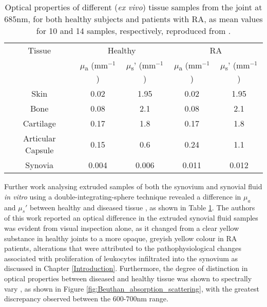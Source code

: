 \documentclass[twoside]{bhamthesis}
\theoremstyle{definition}
\begin{document}
\bgroup
\def\arraystretch{1.2}
\begin{table}[!ht]
\small
\begin{center}
 \begin{tabular}{|c | c c |  c c|}
 \hline
Tissue & \multicolumn{2}{c|}{Healthy} & \multicolumn{2}{c|}{RA}\\ 
 & $\mu$\textsubscript{a} (mm$^{-1}$) &  $\mu$\textsubscript{s}' (mm$^{-1}$)  & $\mu$\textsubscript{a} (mm$^{-1}$) & $\mu$\textsubscript{s}' (mm$^{-1}$) \\ 
 
 \hline
 Skin  & 0.02 & 1.95 & 0.02  & 1.95
 \\ 
 Bone  & 0.08 & 2.1 & 0.08  & 2.1
 \\ 
 Cartilage  & 0.17 & 1.8 & 0.17  & 1.8
 \\ 
 Articular Capsule & 0.15  & 0.6 &0.24 & 1.1
 \\ 
 Synovia & 0.004 & 0.006& 0.011 & 0.012 
 \\
 \hline
\end{tabular}
\caption{Optical properties of different (\textit{ex vivo}) tissue samples from the joint at 685nm, for both healthy subjects and patients with RA, as mean values for 10 and 14 samples, respectively, reproduced from \cite{minet2007analysis}.}
\label{tab:OpticalPropertiesTable}
\end{center}
\end{table}
\egroup

Further work analysing extruded samples of both the synovium and synovial fluid \textit{in vitro} using a double-integrating-sphere technique revealed a difference in $\mu_a$ and $\mu_s'$ between healthy and diseased tissue  \cite{prapavat1997determination,prapavat1997development}, as shown in Table
\ref{tab:OpticalPropertiesTable}. The authors of this work reported an optical difference in the extruded synovial fluid samples was evident from visual inspection alone, as it changed from a clear yellow substance in healthy joints to a more opaque, greyish yellow colour in RA patients, alterations that were attributed to the pathophysiological changes associated with proliferation of leukocytes infiltrated into the synovium as discussed in Chapter 
\ref{Introduction}. Furthermore, the degree of distinction in optical properties between diseased and healthy tissue was shown to spectrally vary \cite{beuthan1996diagnosis}, as shown in Figure \ref{fig:Beuthan_absorption_scattering}, with the greatest discrepancy observed between the 600-700nm range.
\end{document}
